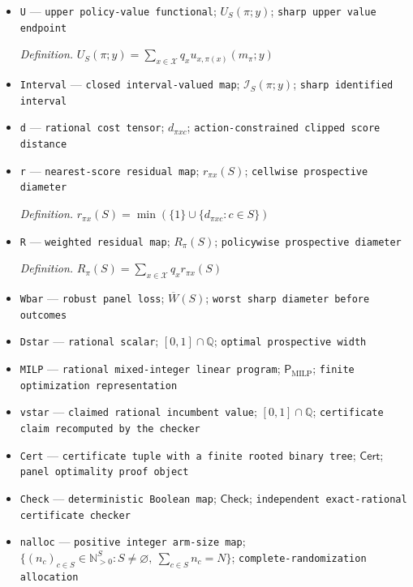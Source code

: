 \documentclass{article}
\begin{document}
\begin{itemize}
  \item \texttt{U} --- \texttt{upper policy-\allowbreak{}value functional}; \(U_S(\pi;y)\); \texttt{sharp upper value endpoint}
  \par\smallskip\noindent\emph{Definition.} \(U_S(\pi;y)=\sum_{x\in\mathcal X}q_xu_{x,\pi(x)}(m_{\pi};y)\)
  \item \texttt{Interval} --- \texttt{closed interval-\allowbreak{}valued map}; \(\mathcal I_S(\pi;y)\); \texttt{sharp identified interval}
  \item \texttt{d} --- \texttt{rational cost tensor}; \(d_{\pi xc}\); \texttt{action-\allowbreak{}constrained clipped score distance}
  \item \texttt{r} --- \texttt{nearest-\allowbreak{}score residual map}; \(r_{\pi x}(S)\); \texttt{cellwise prospective diameter}
  \par\smallskip\noindent\emph{Definition.} \(r_{\pi x}(S)=\min(\{1\}\cup\{d_{\pi xc}:c\in S\})\)
  \item \texttt{R} --- \texttt{weighted residual map}; \(R_{\pi}(S)\); \texttt{policywise prospective diameter}
  \par\smallskip\noindent\emph{Definition.} \(R_{\pi}(S)=\sum_{x\in\mathcal X}q_xr_{\pi x}(S)\)
  \item \texttt{Wbar} --- \texttt{robust panel loss}; \(\overline W(S)\); \texttt{worst sharp diameter before outcomes}
  \item \texttt{Dstar} --- \texttt{rational scalar}; \([0,1]\cap\mathbb Q\); \texttt{optimal prospective width}
  \item \texttt{MILP} --- \texttt{rational mixed-\allowbreak{}integer linear program}; \(\mathsf{P}_{\mathrm{MILP}}\); \texttt{finite optimization representation}
  \item \texttt{vstar} --- \texttt{claimed rational incumbent value}; \([0,1]\cap\mathbb Q\); \texttt{certificate claim recomputed by the checker}
  \item \texttt{Cert} --- \texttt{certificate tuple with a finite rooted binary tree}; \(\mathsf{Cert}\); \texttt{panel optimality proof object}
  \item \texttt{Check} --- \texttt{deterministic Boolean map}; \(\mathsf{Check}\); \texttt{independent exact-\allowbreak{}rational certificate checker}
  \item \texttt{nalloc} --- \texttt{positive integer arm-\allowbreak{}size map}; \(\{(n_c)_{c\in S}\in\mathbb N_{>0}^{S}:S\neq\varnothing,\ \sum_{c\in S}n_c=N\}\); \texttt{complete-\allowbreak{}randomization allocation}

\end{itemize}
\end{document}
